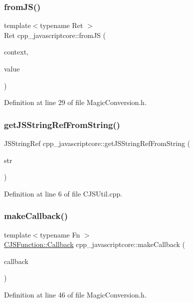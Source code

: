 \subsubsection{\texorpdfstring{from\+J\+S()}{fromJS()}}
{\footnotesize\ttfamily template$<$typename Ret $>$ \\
Ret cpp\+\_\+javascriptcore\+::from\+JS (\begin{DoxyParamCaption}\item[{J\+S\+Context\+Ref}]{context,  }\item[{J\+S\+Value\+Ref}]{value }\end{DoxyParamCaption})}



Definition at line 29 of file Magic\+Conversion.\+h.

\mbox{\label{namespacecpp__javascriptcore_a64c0a5a8f178db673f0eb7704ee78816}} 
\subsubsection{\texorpdfstring{get\+J\+S\+String\+Ref\+From\+String()}{getJSStringRefFromString()}}
{\footnotesize\ttfamily J\+S\+String\+Ref cpp\+\_\+javascriptcore\+::get\+J\+S\+String\+Ref\+From\+String (\begin{DoxyParamCaption}\item[{const std\+::string \&}]{str }\end{DoxyParamCaption})}



Definition at line 6 of file C\+J\+S\+Util.\+cpp.

\mbox{\label{namespacecpp__javascriptcore_ac75c77a83b4f02ba3e0529799f49a313}} 
\subsubsection{\texorpdfstring{make\+Callback()}{makeCallback()}}
{\footnotesize\ttfamily template$<$typename Fn $>$ \\
\mbox{\hyperlink{classcpp__javascriptcore_1_1_c_j_s_function_a3cf83c4e33bfeafbe770047bb75556f5}{C\+J\+S\+Function\+::\+Callback}} cpp\+\_\+javascriptcore\+::make\+Callback (\begin{DoxyParamCaption}\item[{Fn \&\&}]{callback }\end{DoxyParamCaption})}



Definition at line 46 of file Magic\+Conversion.\+h.

